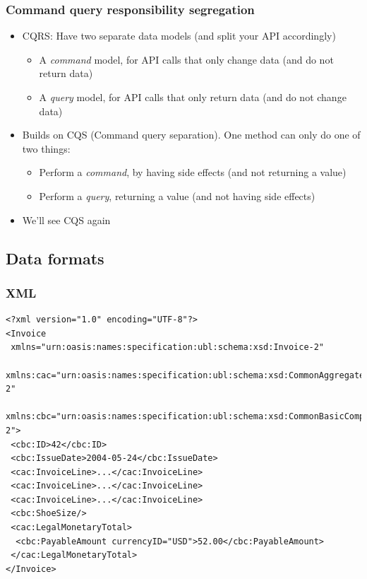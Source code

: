 \documentclass[8pt]{article}
\begin{document}
\subsubsection{Command query responsibility segregation}
\label{sec:org8915489}
\begin{itemize}
\item CQRS: Have two separate data models (and split your API accordingly)
\begin{itemize}
\item A \emph{command} model, for API calls that only change data (and do not return data)
\item A \emph{query} model, for API calls that only return data (and do not change data)
\end{itemize}

\item Builds on CQS (Command query separation). One method can only do one of two things:
\begin{itemize}
\item Perform a \emph{command}, by having side effects (and not returning a value)
\item Perform a \emph{query}, returning a value (and not having side effects)
\end{itemize}

\item We'll see CQS again
\end{itemize}
\subsection{Data formats}
\label{sec:org2452d30}
\subsubsection{XML}
\label{sec:orgad31722}
\begin{verbatim}
<?xml version="1.0" encoding="UTF-8"?>
<Invoice
 xmlns="urn:oasis:names:specification:ubl:schema:xsd:Invoice-2"
 xmlns:cac="urn:oasis:names:specification:ubl:schema:xsd:CommonAggregateComponents-2"
 xmlns:cbc="urn:oasis:names:specification:ubl:schema:xsd:CommonBasicComponents-2">
 <cbc:ID>42</cbc:ID>
 <cbc:IssueDate>2004-05-24</cbc:IssueDate>
 <cac:InvoiceLine>...</cac:InvoiceLine>
 <cac:InvoiceLine>...</cac:InvoiceLine>
 <cac:InvoiceLine>...</cac:InvoiceLine>
 <cbc:ShoeSize/>
 <cac:LegalMonetaryTotal>
  <cbc:PayableAmount currencyID="USD">52.00</cbc:PayableAmount>
 </cac:LegalMonetaryTotal>
</Invoice>
\end{verbatim}
\end{document}
